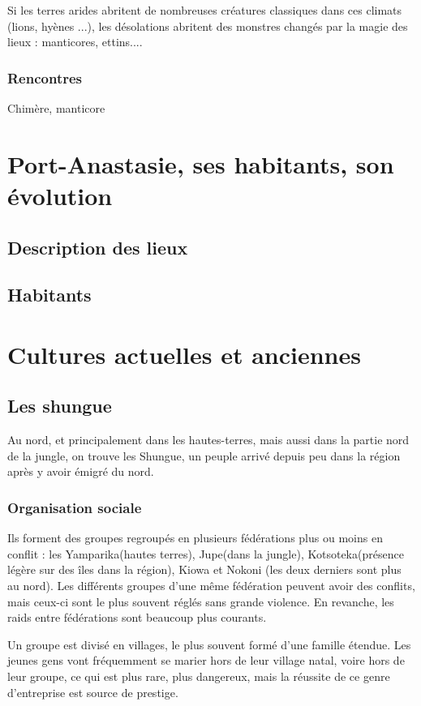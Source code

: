\documentclass[10pt,a4paper]{book}
\begin{document}
Si les terres arides abritent de nombreuses créatures classiques dans ces climats (lions, hyènes ...), les désolations abritent des monstres changés par la magie des lieux : manticores, ettins....
\subsection{Rencontres}
Chimère, manticore
\chapter{Port-Anastasie, ses habitants, son évolution}
\section{Description des lieux}
\section{Habitants}


\chapter{Cultures actuelles et anciennes}
\section{Les shungue}
Au nord, et principalement dans les hautes-terres, mais aussi dans la partie nord de la jungle, on trouve les Shungue, un peuple arrivé depuis peu dans la région après y avoir émigré du nord. 


\subsection{Organisation sociale}
Ils forment des groupes regroupés en plusieurs fédérations plus ou moins en conflit : les Yamparika(hautes terres), Jupe(dans la jungle),  Kotsoteka(présence légère sur des îles dans la région), Kiowa et Nokoni (les deux derniers sont plus au nord). Les différents groupes d'une même fédération peuvent avoir des conflits, mais ceux-ci sont le plus souvent réglés sans grande violence. En revanche, les raids entre fédérations sont beaucoup plus courants.

Un groupe est divisé en villages, le plus souvent formé d'une famille étendue. Les jeunes gens vont fréquemment se marier hors de leur village natal, voire hors de leur groupe, ce qui est plus rare, plus dangereux, mais la réussite de ce genre d'entreprise est source de prestige.
\end{document}
